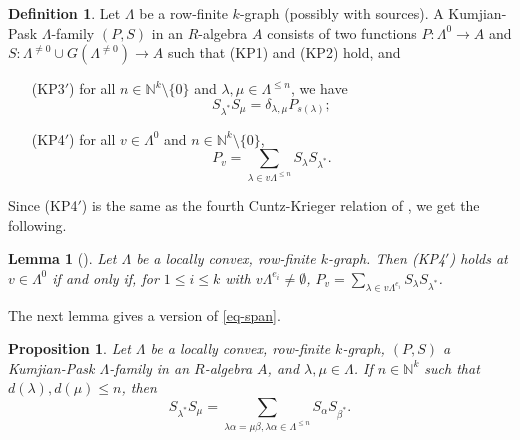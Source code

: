 \documentclass[a4paper,12pt]{amsart}
\numberwithin{equation}{section}
\newtheorem{prop}[thm]{Proposition}
\newtheorem{lemma}[thm]{Lemma}
\theoremstyle{definition}
\newtheorem{defn}[thm]{Definition}
\theoremstyle{remark}
\begin{document}
\begin{defn}\label{KPsources}
Let $\Lambda$ be a row-finite $k$-graph (possibly with sources).
A Kumjian-Pask $\Lambda$-family $(P,S)$ 
in an $R$-algebra $A$ consists of two functions $P:\Lambda^0 \to A$ and 
$S:\Lambda^{\neq0}\cup G(\Lambda^{\neq 0}) \to A$ such that (KP1) and (KP2) hold, and 
\begin{enumerate}
\item[(KP3$'$)] for all $n \in {\mathbb{N}}^k\setminus\{0\}$ and 
$\lambda, \mu \in \Lambda^{\leq n}$, we have \[S_{\lambda^{*}}S_\mu=\delta_{\lambda,\mu}P_{s(\lambda)};\]
\item[(KP4$'$)] for all $v \in \Lambda^0$ and $n \in {\mathbb{N}}^k\setminus \{0\}$,  
\begin{equation*}
P_v=\sum_{\lambda \in v\Lambda^{\leq n}}S_\lambda S_{\lambda^{*}}.
\end{equation*}
\end{enumerate}
\end{defn}

Since (KP4$'$) is  the same as the fourth Cuntz-Krieger relation
of \cite[Definition~3.3]{RSY03},
we get the following.

\begin{lemma}[]\label{lem-kp4alt}
Let $\Lambda$ be a locally convex, row-finite $k$-graph.  Then (KP4$'$) 
holds at $v\in\Lambda^0$ if and only if, for $1\leq i\leq k$ with
$v\Lambda^{e_i} \neq \emptyset$, $P_v=\sum_{\lambda \in v\Lambda^{e_i}}S_\lambda S_{\lambda^{*}}$.
\end{lemma}

The next lemma gives a version of  \eqref{eq-span}.

\begin{prop}
\label{prop:lspfamily}
Let $\Lambda$ be a locally convex, row-finite $k$-graph, $(P,S)$
a Kumjian-Pask $\Lambda$-family in an $R$-algebra $A$, and $\lambda,\mu \in \Lambda$.
If $n\in {\mathbb{N}}^k$  such that $d(\lambda),d(\mu) \leq n$, 
then 
\[
S_{\lambda^{*}}S_\mu=\sum_{\lambda\alpha=\mu\beta, 
\lambda\alpha \in \Lambda^{\leq n}} S_\alpha S_{\beta^{*}}.
\]
\end{prop}
\end{document}
